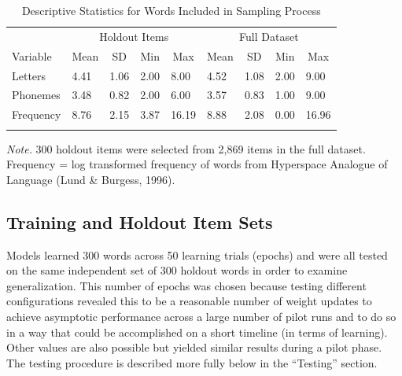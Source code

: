 \documentclass[
  ,man,floatsintext]{apa6}
\begin{document}
\begin{table}[tbp]

\begin{center}
\begin{threeparttable}

\caption{\label{tab:table1}Descriptive Statistics for Words Included in Sampling Process}

\begin{tabular}{lllllllll}
\toprule
 & \multicolumn{4}{c}{Holdout Items} & \multicolumn{4}{c}{Full Dataset} \\
\cmidrule(r){2-5} \cmidrule(r){6-9}
Variable & \multicolumn{1}{c}{Mean} & \multicolumn{1}{c}{SD} & \multicolumn{1}{c}{Min} & \multicolumn{1}{c}{Max} & \multicolumn{1}{c}{Mean} & \multicolumn{1}{c}{SD} & \multicolumn{1}{c}{Min} & \multicolumn{1}{c}{Max}\\
\midrule
Letters & 4.41 & 1.06 & 2.00 & 8.00 & 4.52 & 1.08 & 2.00 & 9.00\\
Phonemes & 3.48 & 0.82 & 2.00 & 6.00 & 3.57 & 0.83 & 1.00 & 9.00\\
Frequency & 8.76 & 2.15 & 3.87 & 16.19 & 8.88 & 2.08 & 0.00 & 16.96\\
\bottomrule
\addlinespace
\end{tabular}

\begin{tablenotes}[para]
\normalsize{\textit{Note.} 300 holdout items were selected from 2,869 items in the full dataset. Frequency = log transformed frequency of words from Hyperspace Analogue of Language (Lund \& Burgess, 1996).}
\end{tablenotes}

\end{threeparttable}
\end{center}

\end{table}

\hypertarget{training-and-holdout-item-sets}{%
\subsection{Training and Holdout Item Sets}\label{training-and-holdout-item-sets}}

Models learned 300 words across 50 learning trials (epochs) and were all tested on the same independent set of 300 holdout words in order to examine generalization. This number of epochs was chosen because testing different configurations revealed this to be a reasonable number of weight updates to achieve asymptotic performance across a large number of pilot runs and to do so in a way that could be accomplished on a short timeline (in terms of learning). Other values are also possible but yielded similar results during a pilot phase. The testing procedure is described more fully below in the ``Testing'' section.
\end{document}
